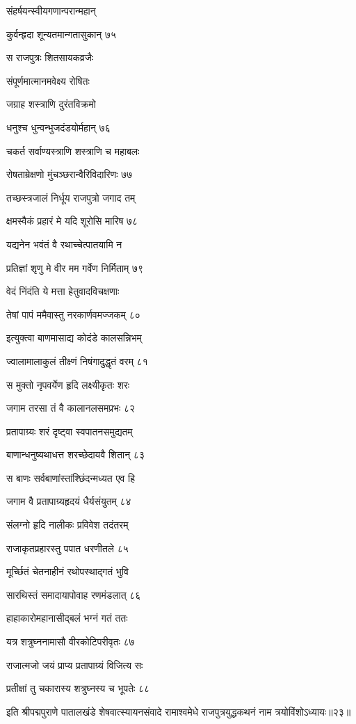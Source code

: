 संहर्षयन्स्वीयगणान्परान्महान्

कुर्वन्हृदा शून्यतमान्गतासुकान् ७५

स राजपुत्रः शितसायकव्रजैः

संपूर्णमात्मानमवेक्ष्य रोषितः

जग्राह शस्त्राणि दुरंतविक्रमो

धनुश्च धुन्वन्भुजदंडयोर्महान् ७६

चकर्त सर्वाण्यस्त्राणि शस्त्राणि च महाबलः

रोषताम्रेक्षणो मुंचञ्छरान्वैरिविदारिणः ७७

तच्छस्त्रजालं निर्धूय राजपुत्रो जगाद तम्

क्षमस्वैकं प्रहारं मे यदि शूरोसि मारिष ७८

यद्यनेन भवंतं वै रथाच्चेत्पातयामि न

प्रतिज्ञां शृणु मे वीर मम गर्वेण निर्मिताम् ७९

वेदं निंदंति ये मत्ता हेतुवादविचक्षणाः

तेषां पापं ममैवास्तु नरकार्णवमज्जकम् ८०

इत्युक्त्वा बाणमासाद्य कोदंडे कालसन्निभम्

ज्वालामालाकुलं तीक्ष्णं निषंगादुद्धृतं वरम् ८१

स मुक्तो नृपवर्येण हृदि लक्ष्यीकृतः शरः

जगाम तरसा तं वै कालानलसमप्रभः ८२

प्रतापाग्र्यः शरं दृष्ट्वा स्वपातनसमुद्यतम्

बाणान्धनुष्यथाधत्त शरच्छेदायवै शितान् ८३

स बाणः सर्वबाणांस्तांश्छिंदन्मध्यत एव हि

जगाम वै प्रतापाग्र्यहृदयं धैर्यसंयुतम् ८४

संलग्नो हृदि नालीकः प्रविवेश तदंतरम्

राजाकृतप्रहारस्तु पपात धरणीतले ८५

मूर्च्छितं चेतनाहीनं रथोपस्थाद्गतं भुवि

सारथिस्तं समादायापोवाह रणमंडलात् ८६

हाहाकारोमहानासीद्बलं भग्नं गतं ततः

यत्र शत्रुघ्ननामासौ वीरकोटिपरीवृतः ८७

राजात्मजो जयं प्राप्य प्रतापाग्र्यं विजित्य सः

प्रतीक्षां तु चकारास्य शत्रुघ्नस्य च भूपतेः ८८

इति श्रीपद्मपुराणे पातालखंडे शेषवात्स्यायनसंवादे रामाश्वमेधे राजपुत्रयुद्धकथनं नाम त्रयोविंशोऽध्यायः॥२३॥


